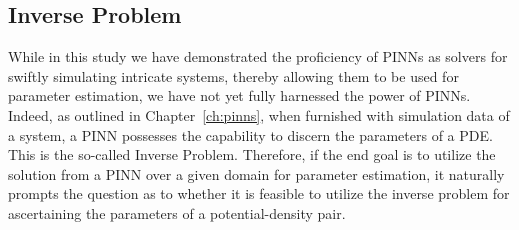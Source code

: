\subsection{Inverse Problem}

While in this study we have demonstrated the proficiency of PINNs as solvers for swiftly simulating intricate systems, thereby allowing them to be used for parameter estimation, we have not yet fully harnessed the power of PINNs. Indeed, as outlined in Chapter~\ref{ch:pinns}, when furnished with simulation data of a system, a PINN possesses the capability to discern the parameters of a PDE. This is the so-called Inverse Problem. Therefore, if the end goal is to utilize the solution from a PINN over a given domain for parameter estimation, it naturally prompts the question as to whether it is feasible to utilize the inverse problem for ascertaining the parameters of a potential-density pair.